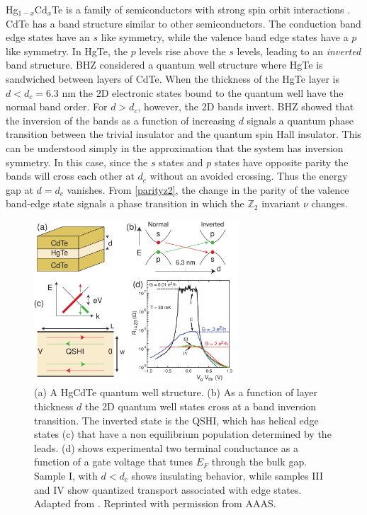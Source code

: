 \documentclass[twocolumn,floatfix,showpacs,rmp,aps]{revtex4}
\begin{document}

Hg$_{1-x}$Cd$_x$Te is a family of semiconductors with strong spin orbit
interactions \cite{dornhaus83}.  CdTe has a band structure similar to other
semiconductors.  The conduction band edge states have an $s$ like symmetry,
while the valence band edge states have a $p$ like symmetry.
In HgTe, the $p$ levels rise above the $s$ levels, leading to an {\it inverted}
band structure.  BHZ considered a quantum well structure where HgTe is
sandwiched between layers of CdTe.  When the thickness of the HgTe layer is
$d < d_c= 6.3$ nm the 2D electronic states bound to the quantum well have the
normal band order.  For $d > d_c$, however, the 2D bands
invert.  BHZ showed that the inversion of the bands as a function of increasing $d$ signals a
quantum phase transition between the trivial insulator and the quantum spin
Hall insulator.   This can be understood simply in the approximation that
the system has inversion symmetry.  In this case, since the $s$ states
and $p$ states have opposite parity the bands will cross each other at $d_c$ without
an avoided crossing.  Thus the energy gap at $d=d_c$ vanishes.
From \eqref{parityz2}, the change in the parity of
the valence band-edge state signals a phase transition in which
the $\mathbb{Z}_2$ invariant $\nu$ changes.

\begin{figure}
\includegraphics[width=3in]{Fig6}
\caption{(a) A HgCdTe quantum well structure.  (b) As a function of layer thickness
$d$ the 2D quantum well states cross at a band inversion transition.  The
inverted state is the QSHI, which has helical edge states (c) that
have a non equilibrium population determined by the leads.  (d) shows
experimental two terminal conductance as a function of a gate voltage that
tunes $E_F$ through the bulk gap.    Sample I, with $d<d_c$ shows insulating
behavior, while samples III and IV show quantized transport associated with
edge states.  Adapted from .  Reprinted with permission from AAAS.}
\label{fig:hgcdtefig}
\end{figure}
\end{document}
